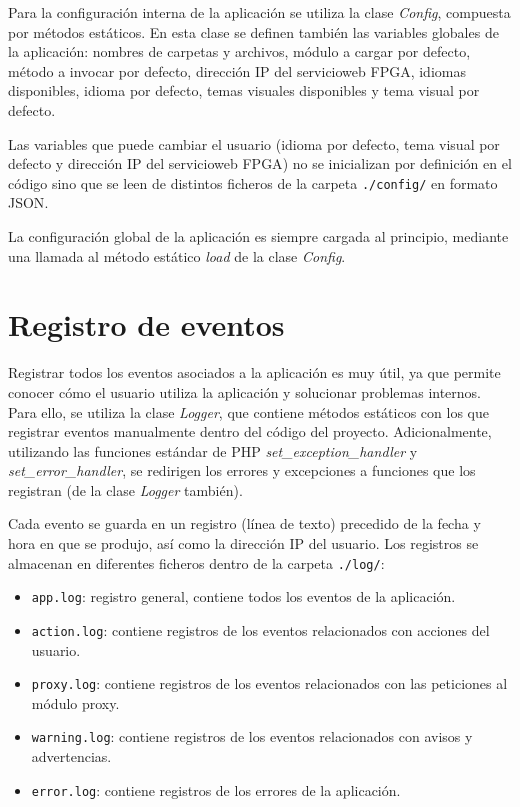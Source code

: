 Para la configuración interna de la aplicación se utiliza la clase \textit{Config}, compuesta por métodos estáticos. En esta clase se definen también las variables globales de la aplicación: nombres de carpetas y archivos, módulo a cargar por defecto, método a invocar por defecto, dirección IP del \gls{servicioweb} \gls{FPGA}, idiomas disponibles, idioma por defecto, temas visuales disponibles y tema visual por defecto.

Las variables que puede cambiar el usuario (idioma por defecto, tema visual por defecto y dirección IP del \gls{servicioweb} \gls{FPGA}) no se inicializan por definición en el código sino que se leen de distintos ficheros de la carpeta \texttt{./config/} en formato \gls{JSON}.

La configuración global de la aplicación es siempre cargada al principio, mediante una llamada al método estático \textit{load} de la clase \textit{Config}.

\section{Registro de eventos\label{extra:mvc:logger}}

Registrar todos los eventos asociados a la aplicación es muy útil, ya que permite conocer cómo el usuario utiliza la aplicación y solucionar problemas internos. Para ello, se utiliza la clase \textit{Logger}, que contiene métodos estáticos con los que registrar eventos manualmente dentro del código del proyecto. Adicionalmente, utilizando las funciones estándar de \gls{PHP} \textit{set\_exception\_handler} y \textit{set\_error\_handler}, se redirigen los errores y excepciones a funciones que los registran (de la clase \textit{Logger} también).

Cada evento se guarda en un registro (línea de texto) precedido de la fecha y hora en que se produjo, así como la dirección IP del usuario. Los registros se almacenan en diferentes ficheros dentro de la carpeta \texttt{./log/}:
\begin{itemize}
  \item \texttt{app.log}: registro general, contiene todos los eventos de la aplicación.
  \item \texttt{action.log}: contiene registros de los eventos relacionados con acciones del usuario.
  \item \texttt{proxy.log}: contiene registros de los eventos relacionados con las peticiones al módulo proxy.
  \item \texttt{warning.log}: contiene registros de los eventos relacionados con avisos y advertencias.
  \item \texttt{error.log}: contiene registros de los errores de la aplicación.
\end{itemize}



